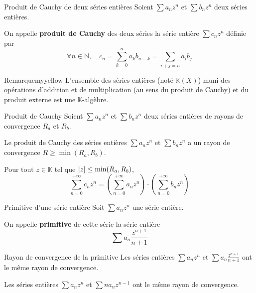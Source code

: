     \begin{defi}{Produit de Cauchy de deux séries entières}{}
        Soient $\sum a_n z^n$ et $\sum b_n z^n$ deux séries entières. 

        On appelle \textbf{produit de Cauchy} des deux séries la série entière $\sum c_n z^n$ définie par 
        \[ \forall n \in \mathbb{N}, \quad c_n = \sum_{k=0}^{n} a_k b_{n-k} = \sum_{i + j = n} a_i b_j \]
    \end{defi}

    \begin{omed}{Remarque}{myyellow}
        L’ensemble des séries entières (noté $\mathbb{K}(X)$) muni des opérations d’addition et de multiplication (au sens du produit de Cauchy) et du produit externe est une $\mathbb{K}$-algèbre.
    \end{omed}

    \begin{prop}{Produit de Cauchy}{}
        Soient $\sum a_n z^n$ et $\sum b_n z^n$ deux séries entières de rayons de convergence $R_a$ et $R_b$.

        \begin{alors}
            \item Le produit de Cauchy des  séries entières $\sum a_n z^n$ et $\sum b_n z^n$ a un rayon de convergence $R \geq \min(R_a,R_b)$.
            \item Pour tout $z \in \mathbb{K}$ tel que $\left\lvert z\right\rvert \leq \min(R_a, R_b)$, 
            \[ \sum_{n=0}^{+\infty} c_n z^n = \left(\sum_{n=0}^{+\infty} a_n z^n\right) \cdotp \left(\sum_{n=0}^{+\infty} b_n z^n\right) \]
        \end{alors}
    \end{prop}

    \begin{defi}{Primitive d’une série entière}{}
        Soit $\sum a_n z^n$ une série entière.

        On appelle \textbf{primitive} de cette série la série entière 
        \[ \sum a_n \frac{z^{n+1}}{n+1} \]
    \end{defi}

    \begin{prop}{Rayon de convergence de la primitive}{}
        Les séries entières $\sum a_n z^n$ et $\sum a_n \frac{z^{n+1}}{n+1}$ ont le même rayon de convergence.
    \end{prop}

    \begin{coro}{}{}
        Les séries entières $\sum a_n z^n$ et $\sum n a_n z^{n-1}$ ont le même rayon de convergence.
    \end{coro}

